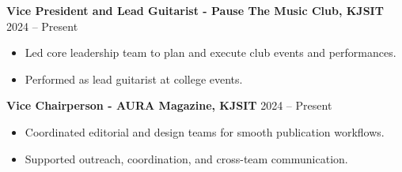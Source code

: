 \documentclass[10pt,a4paper]{article}
\begin{document}
\textbf{Vice President and Lead Guitarist - Pause The Music Club, KJSIT} \hfill 2024 -- Present
\begin{itemize}
    \item Led core leadership team to plan and execute club events and performances.
    \item Performed as lead guitarist at college events.
\end{itemize}

\textbf{Vice Chairperson - AURA Magazine, KJSIT} \hfill 2024 -- Present
\begin{itemize}
    \item Coordinated editorial and design teams for smooth publication workflows.
    \item Supported outreach, coordination, and cross-team communication.
\end{itemize}
\end{document}
